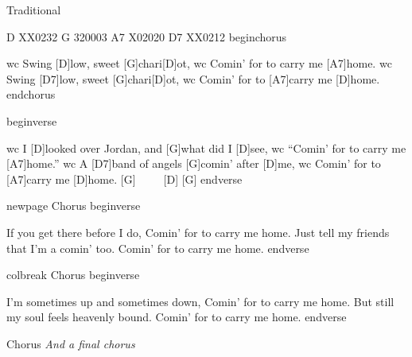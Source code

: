 
Traditional



D XX0232
G 320003
A7 X02020
D7 XX0212
beginchorus

wc Swing [D]low, sweet [G]chari[D]ot,
wc Comin{\textquoteright} for to carry me [A7]home.
wc Swing [D7]low, sweet [G]chari[D]ot,
wc Comin{\textquoteright} for to [A7]carry me [D]home.
endchorus

beginverse

wc I [D]looked over Jordan, and [G]what did I [D]see,
wc    {\textquotedblleft}Comin{\textquoteright} for to carry me [A7]home.{\textquotedblright}
wc A [D7]band of angels [G]comin{\textquoteright} after [D]me,
wc    Comin{\textquoteright} for to [A7]carry me [D]home.     [G]~~~~~[D]     [G]
endverse

newpage
Chorus
beginverse

If you get there before I do,
   Comin{\textquoteright} for to carry me home.
Just tell my friends that I{\textquoteright}m a comin{\textquoteright} too.
   Comin{\textquoteright} for to carry me home.
endverse

colbreak
Chorus
beginverse

I{\textquoteright}m sometimes up and sometimes down,
   Comin{\textquoteright} for to carry me home.
But still my soul feels heavenly bound.
   Comin{\textquoteright} for to carry me home.
endverse

Chorus
\textit{And a final chorus}
